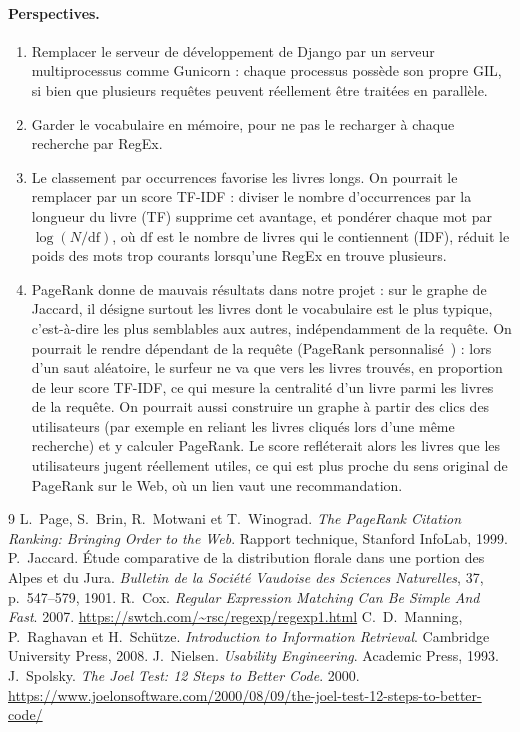 \documentclass[11pt,a4paper]{article}
\begin{document}
\paragraph{Perspectives.}
\begin{enumerate}
    \item Remplacer le serveur de développement de Django par un serveur multiprocessus comme Gunicorn : chaque processus possède son propre GIL, si bien que plusieurs requêtes peuvent réellement être traitées en parallèle.
    \item Garder le vocabulaire en mémoire, pour ne pas le recharger à chaque recherche par RegEx.
    \item Le classement par occurrences favorise les livres longs. On pourrait le remplacer par un score TF-IDF : diviser le nombre d'occurrences par la longueur du livre (TF) supprime cet avantage, et pondérer chaque mot par $\log(N/\mathrm{df})$, où $\mathrm{df}$ est le nombre de livres qui le contiennent (IDF), réduit le poids des mots trop courants lorsqu'une RegEx en trouve plusieurs.
    \item PageRank donne de mauvais résultats dans notre projet : sur le graphe de Jaccard, il désigne surtout les livres dont le vocabulaire est le plus typique, c'est-à-dire les plus semblables aux autres, indépendamment de la requête. On pourrait le rendre dépendant de la requête (PageRank personnalisé~\cite{pagerank}) : lors d'un saut aléatoire, le surfeur ne va que vers les livres trouvés, en proportion de leur score TF-IDF, ce qui mesure la centralité d'un livre parmi les livres de la requête. On pourrait aussi construire un graphe à partir des clics des utilisateurs (par exemple en reliant les livres cliqués lors d'une même recherche) et y calculer PageRank. Le score refléterait alors les livres que les utilisateurs jugent réellement utiles, ce qui est plus proche du sens original de PageRank sur le Web, où un lien vaut une recommandation.
\end{enumerate}

\begin{thebibliography}{9}
     L.~Page, S.~Brin, R.~Motwani et T.~Winograd. \emph{The PageRank Citation Ranking: Bringing Order to the Web}. Rapport technique, Stanford InfoLab, 1999.
     P.~Jaccard. Étude comparative de la distribution florale dans une portion des Alpes et du Jura. \emph{Bulletin de la Société Vaudoise des Sciences Naturelles}, 37, p.~547--579, 1901.
     R.~Cox. \emph{Regular Expression Matching Can Be Simple And Fast}. 2007. \url{https://swtch.com/~rsc/regexp/regexp1.html}
     C.~D.~Manning, P.~Raghavan et H.~Schütze. \emph{Introduction to Information Retrieval}. Cambridge University Press, 2008.
     J.~Nielsen. \emph{Usability Engineering}. Academic Press, 1993.
     J.~Spolsky. \emph{The Joel Test: 12 Steps to Better Code}. 2000. \url{https://www.joelonsoftware.com/2000/08/09/the-joel-test-12-steps-to-better-code/}
\end{thebibliography}
\end{document}
